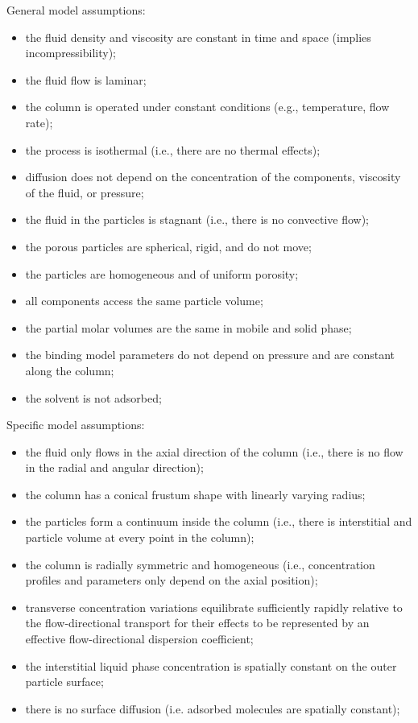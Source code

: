 \documentclass{article}
\begin{document}
General model assumptions:
\begin{itemize}
    \item the fluid density and viscosity are constant in time and space (implies incompressibility);
    \item the fluid flow is laminar;
    \item the column is operated under constant conditions (e.g., temperature, flow rate);
    \item the process is isothermal (i.e., there are no thermal effects);
    \item diffusion does not depend on the concentration of the components, viscosity of the fluid, or pressure;
    \item the fluid in the particles is stagnant (i.e., there is no convective flow);
    \item the porous particles are spherical, rigid, and do not move;
    \item the particles are homogeneous and of uniform porosity;
    \item all components access the same particle volume;
    \item the partial molar volumes are the same in mobile and solid phase;
    \item the binding model parameters do not depend on pressure and are constant along the column;
    \item the solvent is not adsorbed;
\end{itemize}

Specific model assumptions:
\begin{itemize}
    \item the fluid only flows in the axial direction of the column (i.e., there is no flow in the radial and angular direction);
    \item the column has a conical frustum shape with linearly varying radius;
    \item the particles form a continuum inside the column (i.e., there is interstitial and particle volume at every point in the column);
    \item the column is radially symmetric and homogeneous (i.e., concentration profiles and parameters only depend on the axial position);
    \item transverse concentration variations equilibrate sufficiently rapidly relative to the flow-directional transport for their effects to be represented by an effective flow-directional dispersion coefficient;
    \item the interstitial liquid phase concentration is spatially constant on the outer particle surface;
    \item there is no surface diffusion (i.e. adsorbed molecules are spatially constant);
\end{itemize}
\end{document}
